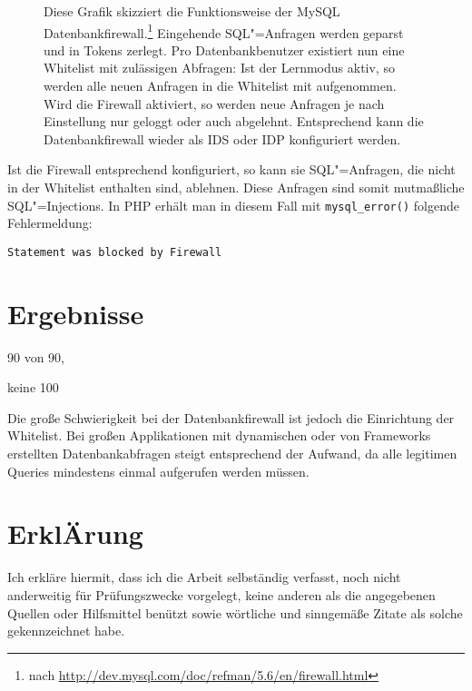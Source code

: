 \begin{figure}[ht]
\begin{margincap}
\begin{tikzpicture}[node distance = 1.5cm, every node/.style={draw=white, align=center, text centered, draw=white, font=\footnotesize\sffamily,fill=documentColor!80, text=white,inner sep=5pt,minimum width=3cm}]
\end{tikzpicture}

\caption[db firewall]{Diese Grafik skizziert die Funktionsweise der MySQL Datenbankfirewall.\footnote{nach \url{http://dev.mysql.com/doc/refman/5.6/en/firewall.html}} Eingehende SQL"=Anfragen werden geparst und in Tokens zerlegt. Pro Datenbankbenutzer existiert nun eine Whitelist mit zulässigen Abfragen: Ist der Lernmodus aktiv, so werden alle neuen Anfragen in die Whitelist mit aufgenommen. Wird die Firewall aktiviert, so werden neue Anfragen je nach Einstellung nur geloggt oder auch abgelehnt. Entsprechend kann die Datenbankfirewall wieder als IDS oder IDP konfiguriert werden. }
\label{img:db_firewall}
\end{margincap}
\end{figure}


Ist die Firewall entsprechend konfiguriert, so kann sie SQL"=Anfragen, die nicht in der Whitelist enthalten sind, ablehnen. Diese Anfragen sind somit mutmaßliche SQL"=Injections. In PHP erhält man in diesem Fall mit \texttt{mysql_error()} folgende Fehlermeldung:

\begin{listing}
\begin{verbatim}
Statement was blocked by Firewall
\end{verbatim}
\end{listing}



\chapter{Ergebnisse}

90 von 90,

keine 100%

Die große Schwierigkeit bei der Datenbankfirewall ist jedoch die Einrichtung der Whitelist. Bei großen Applikationen mit dynamischen oder von Frameworks erstellten Datenbankabfragen steigt entsprechend der Aufwand, da alle legitimen Queries mindestens einmal aufgerufen werden müssen.

\printbibliography


\chapter*{Erkl{\huge Ä}rung}
Ich erkläre hiermit, dass ich die Arbeit selbständig verfasst, noch nicht anderweitig für Prüfungszwecke vorgelegt, keine anderen als die angegebenen Quellen oder Hilfsmittel benützt sowie wörtliche und sinngemäße Zitate als solche gekennzeichnet habe.


